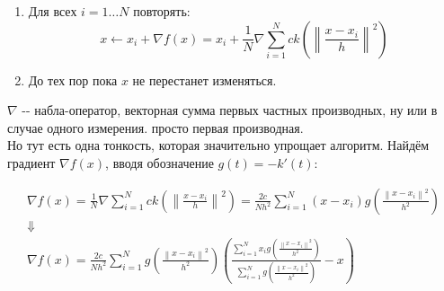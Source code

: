 \documentclass[11pt]{article}
\begin{document}
\begin{enumerate}
\item Для всех $i=1 \ldots N$ повторять:
$$
x \gets x_i + \nabla f(x) = x_i + \frac{1}{N}\nabla\sum\limits_{i = 1}^{N}ck\left(\left\|\frac{x - x_i}{h}\right\|^2\right)
$$
\item До тех пор пока $x$ не перестанет изменяться.
\end{enumerate}

$\nabla$ -\/- набла-оператор, векторная сумма первых частных
производных, ну или в случае одного измерения. просто первая
производная. \\ Но тут есть одна тонкость, которая
значительно упрощает алгоритм. Найдём градиент $\nabla f(x)$, вводя
обозначение $g(t) = -k'(t)$:

\begin{gather*}
\nabla f(x) = \frac{1}{N}\nabla\sum\limits_{i = 1}^{N}ck\left(\left\|\frac{x - x_i}{h}\right\|^2\right) = \frac{2c}{Nh^2}\sum\limits_{i = 1}^{N}\left(x - x_i \right)g\left(\frac{\left\|x - x_i\right\|^2}{h^2}\right) \\
\Downarrow \\
\nabla f(x) = \frac{2c}{Nh^2}\sum\limits_{i = 1}^{N}g\left(\frac{\left\|x - x_i\right\|^2}{h^2}\right)\left(\frac{\sum\limits_{i = 1}^{N}x_i g\left(\frac{\left\|x - x_i\right\|^2}{h^2}\right)}{\sum\limits_{i = 1}^{N}g\left(\frac{\left\|x - x_i\right\|^2}{h^2}\right)} - x \right)
\end{gather*}
\end{document}
